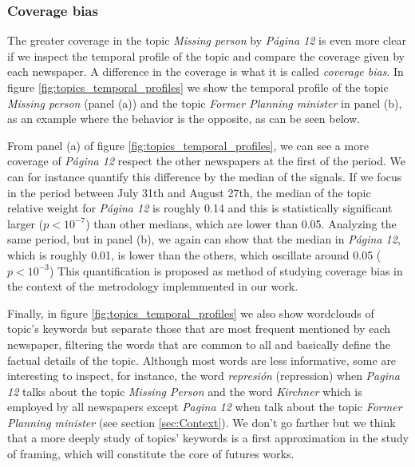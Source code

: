 \documentclass{bmcart}
\begin{document}
\subsubsection*{Coverage bias}

\par The greater coverage in the topic \emph{Missing person} by \emph{Página 12} is even more clear if we inspect the temporal profile of the topic and compare the coverage given by each newspaper. A difference in the coverage is what it is called \emph{coverage bias}.
In figure \ref{fig:topics_temporal_profiles} we show the temporal profile of the topic \emph{Missing person} (panel (a)) and the topic \emph{Former Planning minister} in panel (b), as an example where the behavior is the opposite, as can be seen below.

\par From panel (a) of figure \ref{fig:topics_temporal_profiles}, we can see a more coverage of \emph{Página 12} respect the other newspapers at the first of the period. We can for instance quantify this difference by the median of the signals. If we focus in the period between July 31th and August 27th, the median of the topic relative weight for \emph{Página 12} is roughly 0.14 and this is statistically significant larger ($p < 10^{-7}$) than other medians, which are lower than 0.05.
Analyzing the same period, but in panel (b), we again can show that the median in \emph{Página 12}, which is roughly 0.01, is lower than the others, which oscillate around 0.05 ($p<10^{-3}$)
This quantification is proposed as method of studying coverage bias in the context of the metrodology implemmented in our work.

\par Finally, in figure \ref{fig:topics_temporal_profiles} we also show wordclouds of topic's keywords but separate those that are most frequent mentioned by each newspaper, filtering the words that are common to all and basically define the factual details of the topic.
Although most words are less informative, some are interesting to inspect, for instance, the word \emph{represión} (repression) when \emph{Pagina 12} talks about the topic \emph{Missing Person} and the word \emph{Kirchner} which is employed by all newspapers except \emph{Pagina 12} when talk about the topic \emph{Former Planning minister} (see section \ref{sec:Context}).
We don't go farther but we think that a more deeply study of topics' keywords is a first approximation in the study of framing, which will constitute the core of futures works.
\end{document}
